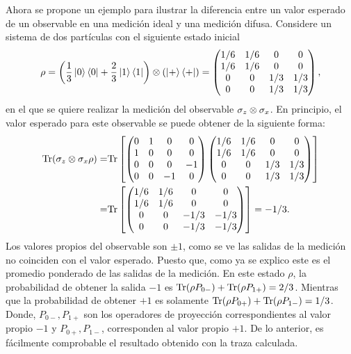 Ahora se propone un ejemplo para ilustrar la diferencia entre un valor esperado de un observable en una medición ideal y una medición difusa. Considere un sistema de dos partículas con el siguiente estado inicial \[\rho= \left(\frac{1}{3}\ket{0}\bra{0}+\frac{2}{3}\ket{1}\bra{1}\right)\otimes\left(\ket{+}\bra{+}\right)=\begin{pmatrix}
    1/6&1/6&0&0\\
    1/6&1/6&0&0\\
    0&0&1/3&1/3\\
    0&0&1/3&1/3\\
\end{pmatrix},\] en el que se quiere realizar la medición del observable $\sigma_z\otimes\sigma_x$. En principio, el valor esperado para este observable se puede obtener de la siguiente forma:
\[\begin{split}
    {\rm Tr}(\sigma_z\otimes\sigma_x \rho) =& {\rm Tr}\left[ \begin{pmatrix}
    0&1&0&0\\
    1&0&0&0\\
    0&0&0&-1\\
    0&0&-1&0\\
\end{pmatrix}\begin{pmatrix}
    1/6&1/6&0&0\\
    1/6&1/6&0&0\\
    0&0&1/3&1/3\\
    0&0&1/3&1/3\\
\end{pmatrix}\right]\\
=& {\rm Tr}\left[ \begin{pmatrix}
    1/6&1/6&0&0\\
    1/6&1/6&0&0\\
    0&0&-1/3&-1/3\\
    0&0&-1/3&-1/3\\
\end{pmatrix}\right]=-1/3. \end{split}\] Los valores propios del observable son $\pm 1$, como se ve las salidas de la medición no coinciden con el valor esperado. Puesto que, como ya se explico este es el promedio ponderado de las salidas de la medición.  En este estado $\rho$, la probabilidad de obtener  la salida $-1$ es ${\rm Tr}(\rho P_{0-})+{\rm Tr}(\rho P_{1+})=2/3$. Mientras que la probabilidad de obtener $+1$ es solamente ${\rm Tr}(\rho P_{0+})+{\rm Tr}(\rho P_{1-})=1/3$. Donde, $ P_{0-}, P_{1+}$ son los operadores de proyección correspondientes al valor propio $-1$ y $ P_{0+}, P_{1-}$, corresponden al valor propio $+1$. De lo anterior, es fácilmente comprobable el resultado obtenido con la traza calculada.

